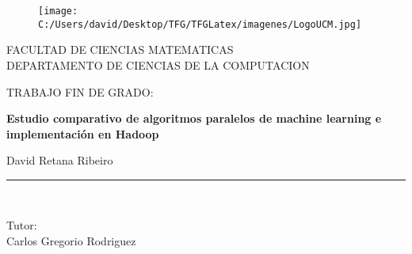 \begin{titlepage}

\begin{center}

	\vspace*{-1in}
	
	\begin{figure}[htb]
		\begin{center}
			\texttt{[image: C:/Users/david/Desktop/TFG/TFGLatex/imagenes/LogoUCM.jpg]}
		\end{center}
	\end{figure}

	FACULTAD DE CIENCIAS MATEMATICAS\\
	\vspace*{0.15in}
	DEPARTAMENTO DE CIENCIAS DE LA COMPUTACION \\
	\vspace*{0.6in}
	
	\begin{large}
		TRABAJO FIN DE GRADO:\\
	\end{large}
	
	\vspace*{0.2in}
	
	\begin{Large}
		\textbf{Estudio comparativo de algoritmos paralelos de machine learning e 
		implementación en Hadoop } \\
	\end{Large}
	
	\vspace*{0.3in}
	
	\begin{large}
		David Retana Ribeiro\\
	\end{large}
	
	\vspace*{0.3in}
	\rule{80mm}{0.1mm}\\
	\vspace*{0.1in}
	
	\begin{large}
		Tutor: \\
		Carlos Gregorio Rodriguez \\
	\end{large}
	
\end{center}

\end{titlepage}
